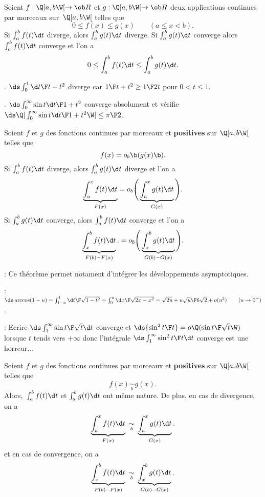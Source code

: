 \Propriete [$a\in\ob R$, $b>a$ un élément de $\ol R$] 
Soient $f:\Q[a,b\W[\to\ob R$ et $g:\Q[a,b\W[\to\ob R$ deux applications continues par morceaux sur~$\Q[a,b\W[$ telles que 
$$
0\le f(x)\le g(x)\qquad (a\le x<b). 
$$
Si $\int_a^bf(t)\d t$ diverge, alors $\int_a^bg(t)\d t$ diverge. \medskip\noindent
Si $\int_a^bg(t)\d t$ converge alors $\int_a^bf(t)\d t$ converge et l'on a 
$$
0\le \int_a^bf(t)\d t\le \int_a^bg(t)\d t. 
$$ 

\Exemple. $\ds\int_0^1{\d t\F t+t^2}$ diverge car ${1\F t+t^2}\ge{1\F 2t}$ pour $0<t\le 1$. 

\Exemple. $\ds\int_0^\infty{\sin t\d t\F1+t^2}$ converge absolument et vérifie 
$\ds\Q|\int_0^\infty{\sin t\d t\F1+t^2}\W|\le {\pi\F2}$. 
\medskip

\Theoreme [$a\in\ob R$ et $b>a$ élément de $\ol R$]
Soient $f$ et $g$ des fonctions continues par morceaux et {\bf positives} sur $\Q[a,b\W[$ telles que 
$$
f(x)=o_b\b(g(x)\b).
$$ 
Si $\int_a^b f(t)\d t$ diverge, alors $\int_a^bg(t)\d t$ diverge et l'on a 
$$
\underbrace{\int_a^x f(t)\d t}_{F(x)}=o_b\Bigg(\underbrace{\int_a^xg(t)\d t}_{G(x)}\Bigg). 
$$
Si $\int_a^b g(t)\d t$ converge, alors $\int_a^bf(t)\d t$ converge et l'on a 
$$
\underbrace{\int_x^b f(t)\d t}_{F(b)-F(x)}.=o_b\Bigg(\underbrace{\int_x^bg(t)\d t}_{G(b)-G(x)}\Bigg). 
$$

\Remarque : Ce théorème permet notament d'intégrer les développements asymptotiques. 
\bigskip

\Application : $\ds \arccos(1-u)=\int_{1-u}^1{\d t\F\sqrt{1-t^2}}
=\int_0^u{\d x\F\sqrt{2x-x^2}}=\sqrt{2u}+{u\sqrt u\F6\sqrt2}+o(u^2)\qquad(u\to0^+)$. 

%
\bigskip

\Remarque : Ecrire $\ds \int_1^\infty{\sin t\F \sqrt t}\d t$ converge 
et $\ds{\sin^2 t\F t}=o\Q({\sin t\F\sqrt t}\W)$ lorsque $t$ tends vers $+\infty$ 
donc l'intégrale $\ds \int_1^\infty{\sin^2 t\F t}\d t$ converge est une horreur...
\bigskip


\Theoreme [$a\in\ob R$ et $b>a$ un élément de $\ol R$] 
Soient $f$ et $g$ des fonctions continues par morceaux et {\bf positives} sur $\Q[a,b\W[$ telles que 
$$
f(x)\mathop{\sim}\limits_bg(x).
$$ 
Alors,~$\int_a^bf(t)\d t$ et $\int_a^bg(t)\d t$ ont même nature. 
De plus, en cas de divergence, on a 
$$
\underbrace{\int_a^xf(t)\d t}_{F(x)}\ \mathop{\sim}_b\ \underbrace{\int_a^xg(t)\d t}_{G(x)}. 
$$
et en cas de convergence, on a 
$$
\underbrace{\int_x^bf(t)\d t}_{F(b)-F(x)}\ \mathop{\sim}_b\ \underbrace{\int_x^bg(t)\d t}_{G(b)-G(x)}.
$$

